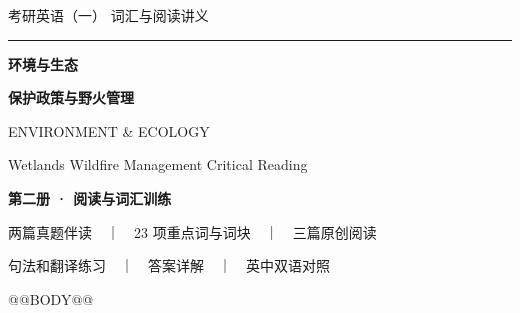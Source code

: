 \documentclass[a4paper,11pt,openany]{report}
\begin{document}
\begin{titlepage}
\thispagestyle{empty}
\sffamily
\vspace*{12mm}
{\CJKsf\color{leaf}\large 考研英语（一） \textbar{} 词汇与阅读讲义}\par
\vspace{40mm}
{\color{accentgold}\rule{22mm}{2pt}}\par
\vspace{10mm}
{\CJKsf\color{deepforest}\fontsize{34}{44}\selectfont\bfseries 环境与生态}\par
\vspace{4mm}
{\CJKsf\color{deepforest}\fontsize{20}{28}\selectfont\bfseries 保护政策与野火管理}\par
\vspace{13mm}
{\color{leaf}\fontsize{13}{18}\selectfont ENVIRONMENT \& ECOLOGY}\par
\vspace{3mm}
{\color{bodygrey}\fontsize{11}{17}\selectfont Wetlands \textperiodcentered{} Wildfire Management \textperiodcentered{} Critical Reading}\par
\vfill
\begin{tcolorbox}[colback=softsand,colframe=softsand,boxrule=0pt,arc=1mm,left=4mm,right=4mm,top=5mm,bottom=5mm]
{\CJKsf\color{deepforest}\bfseries 第二册 · 阅读与词汇训练}\par\vspace{1mm}
{\CJKsf\color{bodygrey}\normalsize 两篇真题伴读　｜　23 项重点词与词块　｜　三篇原创阅读}\par
{\CJKsf\color{bodygrey}\normalsize 句法和翻译练习　｜　答案详解　｜　英中双语对照}\par
\end{tcolorbox}
\vspace{12mm}
\end{titlepage}
\tableofcontents
\clearpage
{}
@@BODY@@
\end{document}
